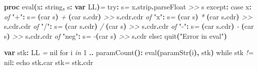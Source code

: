 \documentclass[
  12pt,
]{book}
\newenvironment{Shaded}{}{}
\newcommand{\CommentTok}[1]{\textcolor[rgb]{0.38,0.63,0.69}{\textit{#1}}}
\newcommand{\DataTypeTok}[1]{\textcolor[rgb]{0.56,0.13,0.00}{#1}}
\newcommand{\FloatTok}[1]{\textcolor[rgb]{0.25,0.63,0.44}{#1}}
\newcommand{\KeywordTok}[1]{\textcolor[rgb]{0.00,0.44,0.13}{\textbf{#1}}}
\newcommand{\NormalTok}[1]{#1}
\newcommand{\StringTok}[1]{\textcolor[rgb]{0.25,0.44,0.63}{#1}}
\begin{document}
\begin{Shaded}
\begin{Highlighting}[]
\KeywordTok{proc }\StringTok{eval}\KeywordTok{(}\NormalTok{x}\KeywordTok{:} \DataTypeTok{string}\KeywordTok{,}\NormalTok{ s}\KeywordTok{:} \KeywordTok{var} \DataTypeTok{LL}\KeywordTok{)}\CommentTok{=}
  \DataTypeTok{try}\KeywordTok{:}\NormalTok{ s}\CommentTok{=}\NormalTok{ x}\KeywordTok{.}\DataTypeTok{strip}\KeywordTok{.}\DataTypeTok{parseFloat} \CommentTok{\textgreater{}\textgreater{}}\NormalTok{ s}
  \DataTypeTok{except}\KeywordTok{:}
    \DataTypeTok{case}\NormalTok{  x}\KeywordTok{:}
      \CommentTok{of} \StringTok{"+"}\KeywordTok{:}\NormalTok{ s}\CommentTok{=} \KeywordTok{(}\DataTypeTok{car}\NormalTok{ s}\KeywordTok{)} \CommentTok{+} \KeywordTok{(}\DataTypeTok{car}\NormalTok{ s}\KeywordTok{.}\DataTypeTok{cdr}\KeywordTok{)} \CommentTok{\textgreater{}\textgreater{}}\NormalTok{ s}\KeywordTok{.}\DataTypeTok{cdr}\KeywordTok{.}\DataTypeTok{cdr}
      \CommentTok{of} \StringTok{"x"}\KeywordTok{:}\NormalTok{ s}\CommentTok{=} \KeywordTok{(}\DataTypeTok{car}\NormalTok{ s}\KeywordTok{)} \CommentTok{*} \KeywordTok{(}\DataTypeTok{car}\NormalTok{ s}\KeywordTok{.}\DataTypeTok{cdr}\KeywordTok{)} \CommentTok{\textgreater{}\textgreater{}}\NormalTok{ s}\KeywordTok{.}\DataTypeTok{cdr}\KeywordTok{.}\DataTypeTok{cdr}
      \CommentTok{of} \StringTok{"/"}\KeywordTok{:}\NormalTok{ s}\CommentTok{=} \KeywordTok{(}\DataTypeTok{car}\NormalTok{ s}\KeywordTok{.}\DataTypeTok{cdr}\KeywordTok{)} \CommentTok{/} \KeywordTok{(}\DataTypeTok{car}\NormalTok{ s}\KeywordTok{)} \CommentTok{\textgreater{}\textgreater{}}\NormalTok{ s}\KeywordTok{.}\DataTypeTok{cdr}\KeywordTok{.}\DataTypeTok{cdr}
      \CommentTok{of} \StringTok{"{-}"}\KeywordTok{:}\NormalTok{ s}\CommentTok{=} \KeywordTok{(}\DataTypeTok{car}\NormalTok{ s}\KeywordTok{.}\DataTypeTok{cdr}\KeywordTok{)} \CommentTok{{-}} \KeywordTok{(}\DataTypeTok{car}\NormalTok{ s}\KeywordTok{)} \CommentTok{\textgreater{}\textgreater{}}\NormalTok{ s}\KeywordTok{.}\DataTypeTok{cdr}\KeywordTok{.}\DataTypeTok{cdr}
      \CommentTok{of} \StringTok{"neg"}\KeywordTok{:}\NormalTok{ s}\CommentTok{=} \CommentTok{{-}}\KeywordTok{(}\DataTypeTok{car}\NormalTok{ s}\KeywordTok{)} \CommentTok{\textgreater{}\textgreater{}}\NormalTok{ s}\KeywordTok{.}\DataTypeTok{cdr}
      \DataTypeTok{else}\KeywordTok{:} \DataTypeTok{quit}\KeywordTok{(}\StringTok{"Error in eval"}\KeywordTok{)}

\KeywordTok{var}\NormalTok{ stk}\KeywordTok{:} \DataTypeTok{LL} \CommentTok{=} \FloatTok{nil}
\DataTypeTok{for}\NormalTok{ i }\CommentTok{in} \DataTypeTok{1} \KeywordTok{..} \DataTypeTok{paramCount}\KeywordTok{():} \DataTypeTok{eval}\KeywordTok{(}\DataTypeTok{paramStr}\KeywordTok{(}\NormalTok{i}\KeywordTok{),}\NormalTok{ stk}\KeywordTok{)}
\DataTypeTok{while}\NormalTok{ stk }\CommentTok{!=} \FloatTok{nil}\KeywordTok{:}
  \DataTypeTok{echo}\NormalTok{ stk}\KeywordTok{.}\DataTypeTok{car}
\NormalTok{  stk}\CommentTok{=}\NormalTok{ stk}\KeywordTok{.}\DataTypeTok{cdr}
\end{Highlighting}
\end{Shaded}
\end{document}
